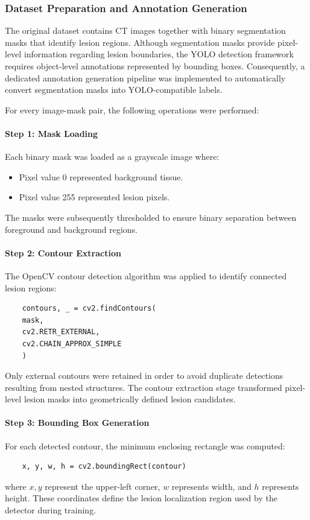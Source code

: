 \subsubsection{Dataset Preparation and Annotation Generation}
The original dataset contains CT images together with binary segmentation masks that identify lesion regions. Although segmentation masks provide pixel-level information regarding lesion boundaries, the YOLO detection framework requires object-level annotations represented by bounding boxes. Consequently, a dedicated annotation generation pipeline was implemented to automatically convert segmentation masks into YOLO-compatible labels.

For every image-mask pair, the following operations were performed:

\paragraph{Step 1: Mask Loading}
Each binary mask was loaded as a grayscale image where:
\begin{itemize}
	\item Pixel value 0 represented background tissue.
	\item Pixel value 255 represented lesion pixels.
\end{itemize}
The masks were subsequently thresholded to ensure binary separation between foreground and background regions.

\paragraph{Step 2: Contour Extraction}
The OpenCV contour detection algorithm was applied to identify connected lesion regions:
\begin{verbatim}
	contours, _ = cv2.findContours(
	mask,
	cv2.RETR_EXTERNAL,
	cv2.CHAIN_APPROX_SIMPLE
	)
\end{verbatim}
Only external contours were retained in order to avoid duplicate detections resulting from nested structures. The contour extraction stage transformed pixel-level lesion masks into geometrically defined lesion candidates.

\paragraph{Step 3: Bounding Box Generation}
For each detected contour, the minimum enclosing rectangle was computed:
\begin{verbatim}
	x, y, w, h = cv2.boundingRect(contour)
\end{verbatim}
where $x, y$ represent the upper-left corner, $w$ represents width, and $h$ represents height. These coordinates define the lesion localization region used by the detector during training.

